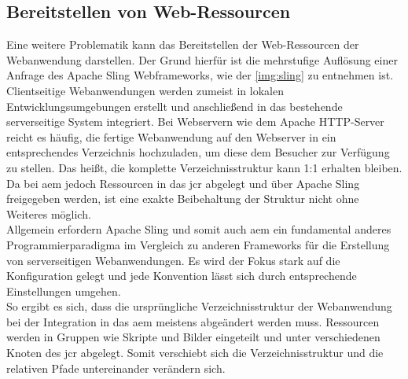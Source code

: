 \subsection{Bereitstellen von Web-Ressourcen}
Eine weitere Problematik kann das Bereitstellen der Web-Ressourcen der Webanwendung darstellen. Der Grund hierfür ist die mehrstufige Auflösung einer Anfrage des Apache Sling Webframeworks, wie der \autoref{img:sling} zu entnehmen ist.\\
Clientseitige Webanwendungen werden zumeist in lokalen Entwicklungsumgebungen erstellt und anschließend in das bestehende serverseitige System integriert. Bei Webservern wie dem Apache HTTP-Server reicht es häufig, die fertige Webanwendung auf den Webserver in ein entsprechendes Verzeichnis hochzuladen, um diese dem Besucher zur Verfügung zu stellen. Das heißt, die komplette Verzeichnisstruktur kann 1:1 erhalten bleiben. \\
Da bei \ac{aem} jedoch Ressourcen in das \ac{jcr} abgelegt und über Apache Sling freigegeben werden, ist eine exakte Beibehaltung der Struktur nicht ohne Weiteres möglich. \\
Allgemein erfordern Apache Sling und somit auch \ac{aem} ein fundamental anderes Programmierparadigma im Vergleich zu anderen Frameworks für die Erstellung von serverseitigen Webanwendungen. Es wird der Fokus stark auf die Konfiguration gelegt und jede Konvention lässt sich durch entsprechende Einstellungen umgehen.\\
So ergibt es sich, dass die ursprüngliche Verzeichnisstruktur der Webanwendung bei der Integration in das \ac{aem} meistens abgeändert werden muss. Ressourcen werden in Gruppen wie Skripte und Bilder eingeteilt und unter verschiedenen Knoten des \ac{jcr} abgelegt. Somit verschiebt sich die Verzeichnisstruktur und die relativen Pfade untereinander verändern sich.